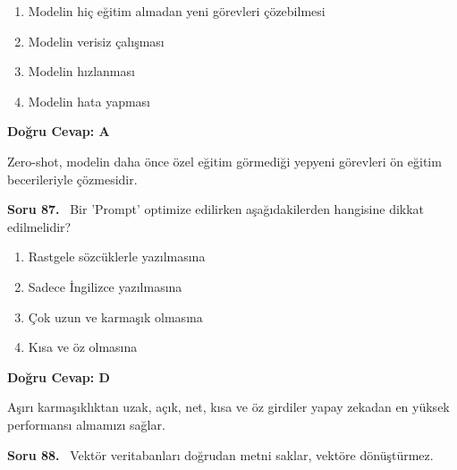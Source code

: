 \documentclass[11pt,a4paper,openany]{book}
\begin{document}
\begin{enumerate}[label=\Alph*), leftmargin=25pt, topsep=4pt, itemsep=2pt]
        \item Modelin hiç eğitim almadan yeni görevleri çözebilmesi
        \item Modelin verisiz çalışması
        \item Modelin hızlanması
        \item Modelin hata yapması
\end{enumerate}

\vspace{4pt}
\begin{tcolorbox}[title=Cevap ve Açıklama, colback=gray!3!white, colframe=primarycolor!90!black, arc=2mm, fonttitle=\bfseries\sffamily, top=6pt, bottom=6pt]
    \textbf{Doğru Cevap: A}
    
    \vspace{2pt}
    Zero-shot, modelin daha önce özel eğitim görmediği yepyeni görevleri ön eğitim becerileriyle çözmesidir.
\end{tcolorbox}
\vspace{10pt}
\needspace{5cm}
\vspace{8pt}
\noindent\textbf{\large\sffamily Soru 87.} \ Bir 'Prompt' optimize edilirken aşağıdakilerden hangisine dikkat edilmelidir?

\begin{enumerate}[label=\Alph*), leftmargin=25pt, topsep=4pt, itemsep=2pt]
        \item Rastgele sözcüklerle yazılmasına
        \item Sadece İngilizce yazılmasına
        \item Çok uzun ve karmaşık olmasına
        \item Kısa ve öz olmasına
\end{enumerate}

\vspace{4pt}
\begin{tcolorbox}[title=Cevap ve Açıklama, colback=gray!3!white, colframe=primarycolor!90!black, arc=2mm, fonttitle=\bfseries\sffamily, top=6pt, bottom=6pt]
    \textbf{Doğru Cevap: D}
    
    \vspace{2pt}
    Aşırı karmaşıklıktan uzak, açık, net, kısa ve öz girdiler yapay zekadan en yüksek performansı almamızı sağlar.
\end{tcolorbox}
\vspace{10pt}
\needspace{5cm}
\vspace{8pt}
\noindent\textbf{\large\sffamily Soru 88.} \ Vektör veritabanları doğrudan metni saklar, vektöre dönüştürmez.
\end{document}
